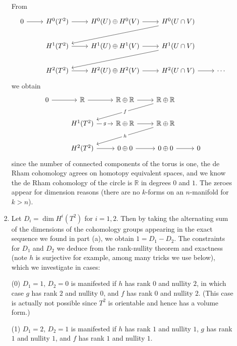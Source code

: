 \documentclass[11pt,leqno]{article}
\theoremstyle{plain}
\theoremstyle{definition}
\numberwithin{equation}{section}
\numberwithin{lem}{section}
\begin{document}
\begin{enumerate}
\begin{enumerate}
        From
\[\begin{tikzcd}
	0 & {H^0(T^2)} & {H^0(U)\oplus H^0(V)} & {H^0(U\cap V)} \\
	& {H^1(T^2)} & {H^1(U)\oplus H^1(V)} & {H^1(U\cap V)} \\
	& {H^2(T^2)} & {H^2(U)\oplus H^2(V)} & {H^2(U\cap V)} & \cdots
	\arrow[from=1-1, to=1-2]
	\arrow[from=1-2, to=1-3]
	\arrow[from=1-3, to=1-4]
	\arrow[from=1-4, to=2-2]
	\arrow[from=2-2, to=2-3]
	\arrow[from=2-3, to=2-4]
	\arrow[from=2-4, to=3-2]
	\arrow[from=3-2, to=3-3]
	\arrow[from=3-3, to=3-4]
	\arrow[from=3-4, to=3-5]
\end{tikzcd}\]
we obtain 
\[\begin{tikzcd}
	0 & {\mathbb R} & {\mathbb R\oplus \mathbb R} & {\mathbb R\oplus\mathbb R} \\
	& {H^1(T^2)} & {\mathbb R\oplus \mathbb R} & {\mathbb R\oplus \mathbb R} \\
	& {H^2(T^2)} & {0\oplus 0} & {0\oplus 0} & 0
	\arrow[from=1-1, to=1-2]
	\arrow[from=1-2, to=1-3]
	\arrow[from=1-3, to=1-4]
	\arrow["f"{description}, from=1-4, to=2-2]
	\arrow["g"{description}, from=2-2, to=2-3]
	\arrow[from=2-3, to=2-4]
	\arrow["h"{description}, from=2-4, to=3-2]
	\arrow[from=3-2, to=3-3]
	\arrow[from=3-3, to=3-4]
	\arrow[from=3-4, to=3-5]
\end{tikzcd}\]
since the number of connected components of the torus is one, the de Rham cohomology agrees on homotopy equivalent spaces, and we know the de Rham cohomology of the circle is $\mathbb R$ in degrees $0$ and $1$. The zeroes appear for dimension reasons (there are no $k$-forms on an $n$-manifold for $k>n$).
        \item Let $D_i = \dim H^i(T^2)$ for $i = 1,2$. Then by taking the alternating sum of the dimensions of the cohomology groups appearing in the exact sequence we found in part (a), we obtain $1 = D_1-D_2$. The constraints for $D_1$ and $D_2$ we deduce from the rank-nullity theorem and exactness (note $h$ is surjective for example, among many tricks we use below), which we investigate in cases:
        
        (0) $D_1=1$, $D_2=0$ is manifested if $h$ has rank $0$ and nullity $2$, in which case $g$ has rank $2$ and nullity $0$, and $f$ has rank $0$ and nullity $2$. (This case is actually not possible since $T^2$ is orientable and hence has a volume form.)
        
        (1) $D_1=2$, $D_2=1$ is manifested if $h$ has rank $1$ and nullity $1$, $g$ has rank $1$ and nullity $1$, and $f$ has rank $1$ and nullity $1$.


\end{enumerate}
\end{enumerate}
\end{document}
